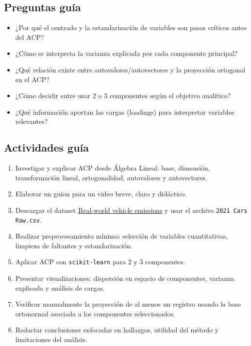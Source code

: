 \documentclass[a4,11pt]{aleph-notas}
\begin{document}
\subsection*{Preguntas guía}
\begin{itemize}[leftmargin=*]
\item ¿Por qué el centrado y la estandarización de variables son pasos críticos antes del ACP?
\item ¿Cómo se interpreta la varianza explicada por cada componente principal?
\item ¿Qué relación existe entre autovalores/autovectores y la proyección ortogonal en el ACP?
\item ¿Cómo decidir entre usar 2 o 3 componentes según el objetivo analítico?
\item ¿Qué información aportan las cargas (loadings) para interpretar variables relevantes?
\end{itemize}

\subsection*{Actividades guía}
\begin{enumerate}[leftmargin=*, label={{\arabic*.}}]
\item Investigar y explicar ACP desde Álgebra Lineal: base, dimensión, transformación lineal, ortogonalidad, autovalores y autovectores.
\item Elaborar un guion para un video breve, claro y didáctico.
\item Descargar el dataset \href{https://www.kaggle.com/datasets/konradb/real-world-vehicle-emissions}{Real-world vehicle emissions} y usar el archivo \texttt{2021 Cars Raw.csv}.
\item Realizar preprocesamiento mínimo: selección de variables cuantitativas, limpieza de faltantes y estandarización.
\item Aplicar ACP con \texttt{scikit-learn} para 2 y 3 componentes.
\item Presentar visualizaciones: dispersión en espacio de componentes, varianza explicada y análisis de cargas.
\item Verificar manualmente la proyección de al menos un registro usando la base ortonormal asociada a los componentes seleccionados.
\item Redactar conclusiones enfocadas en hallazgos, utilidad del método y limitaciones del análisis.
\end{enumerate}
\end{document}
